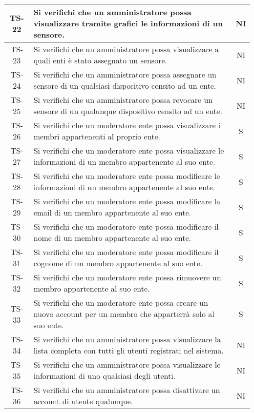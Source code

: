 \begin{center}
\begin{longtable}{|c|p{10cm}|c|}
			 \hline
			 TS-22 & Si verifichi che un amministratore possa visualizzare tramite grafici le informazioni di un sensore. & NI \\
			 \hline
			 TS-23 & Si verifichi che un amministratore possa visualizzare a quali enti è stato assegnato un sensore. & NI \\
			 \hline
			 TS-24 & Si verifichi che un amministratore possa assegnare un sensore di un qualsiasi dispositivo censito ad un ente. & NI \\
			 \hline
			 TS-25 & Si verifichi che un amministratore possa revocare un sensore di un qualunque dispositivo censito ad un ente. & NI \\
			 \hline
			 TS-26 &  Si verifichi che un moderatore ente possa visualizzare i membri appartenenti al proprio ente. & S \\
			 \hline
			 TS-27 & Si verifichi che un moderatore ente possa visualizzare le informazioni di un membro appartenente al suo ente. & S \\
			 \hline
			 TS-28 & Si verifichi che un moderatore ente possa modificare le informazioni di un membro appartenente al suo ente. & S \\
			 \hline
			 TS-29 & Si verifichi che un moderatore ente possa modificare la email di un membro appartenente al suo ente. & S \\
			 \hline
			 TS-30 & Si verifichi che un moderatore ente possa modificare il nome di un membro appartenente al suo ente. & S \\
			 \hline
			 TS-31 & Si verifichi che un moderatore ente possa modificare il cognome di un membro appartenente al suo ente. & S \\
			 \hline
			 TS-32 & Si verifichi che un moderatore ente possa rimuovere un membro appartenente al suo ente. & S \\
			 \hline
			 TS-33 & Si verifichi che un moderatore ente possa creare un nuovo account per un membro che apparterrà solo al suo ente. & S \\
			 \hline
			 TS-34 & Si verifichi che un amministratore possa visualizzare la lista completa con tutti gli utenti registrati nel sistema. & NI \\
			 \hline
			 TS-35 & Si verifichi che un amministratore possa visualizzare le informazioni di uno qualsiasi degli utenti. & NI \\
			 \hline
			 TS-36 & Si verifichi che un amministratore possa disattivare un account di utente qualunque. & NI \\
			 \hline

\end{longtable}
\end{center}
